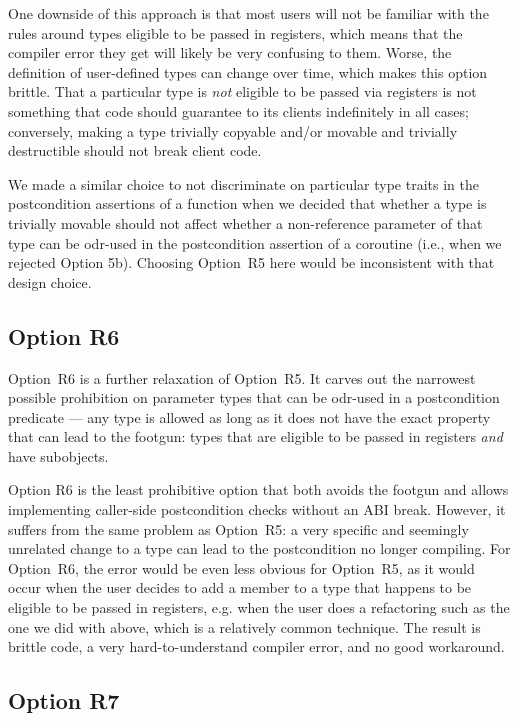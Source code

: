 One downside of this approach is that most users will not be familiar with the rules around types eligible to be passed in registers, which means that the compiler error they get will likely be very confusing to them. Worse, the definition of user-defined types can change over time, which makes this option brittle. That a particular type is \emph{not} eligible to be passed via registers is not something that code should guarantee to its clients indefinitely in all cases; conversely, making a type trivially copyable and/or movable and trivially destructible should not break client code.

We made a similar choice to not discriminate on particular type traits in the postcondition assertions of a function when we decided that whether a type is trivially movable should not affect whether a non-reference parameter of that type can be odr-used in the postcondition assertion of a coroutine (i.e., when we rejected \cite{P3387R0} Option 5b). Choosing Option~R5 here would be inconsistent with that design choice.

\subsection*{Option R6}

Option~R6 is a further relaxation of Option~R5. It carves out the narrowest possible prohibition on parameter types that can be odr-used in a postcondition predicate --- any type is allowed as long as it does not have the exact property that can lead to the footgun: types that are eligible to be passed in registers \emph{and} have  subobjects.

Option R6 is the least prohibitive option that both avoids the footgun and allows implementing caller-side postcondition checks without an ABI break. However, it suffers from the same problem as Option~R5: a very specific and seemingly unrelated change to a type can lead to the postcondition no longer compiling. For Option~R6, the error would be even less obvious for Option~R5, as it would occur when the user decides to add a  member to a type that happens to be eligible to be passed in registers, e.g. when the user does a refactoring such as the one we did with  above, which is a relatively common technique. The result is brittle code, a very hard-to-understand compiler error, and no good workaround.

\subsection*{Option R7}

